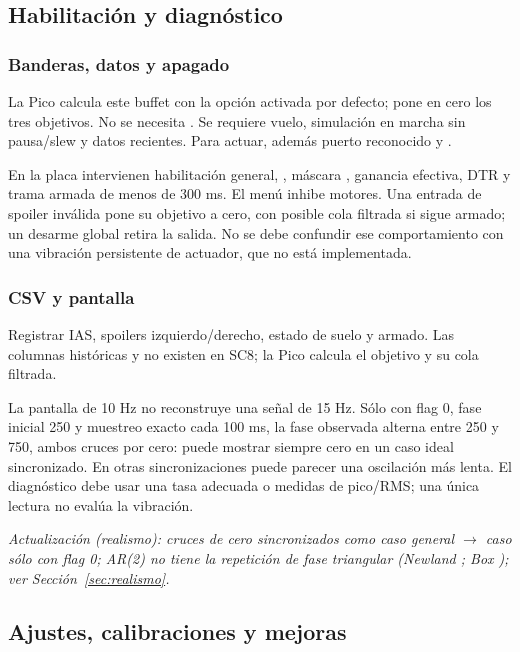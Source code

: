 \subsection{Habilitación y diagnóstico}
\subsubsection{Banderas, datos y apagado}
La Pico calcula este buffet con la opción activada por defecto;  pone en cero los tres objetivos. No se necesita . Se requiere vuelo, simulación en marcha sin pausa/slew y datos recientes. Para actuar, además puerto reconocido y .

En la placa intervienen habilitación general, , máscara , ganancia efectiva, DTR y trama armada de menos de 300 ms. El menú inhibe motores. Una entrada de spoiler inválida pone su objetivo a cero, con posible cola filtrada si sigue armado; un desarme global retira la salida. No se debe confundir ese comportamiento con una vibración persistente de actuador, que no está implementada.

\subsubsection{CSV y pantalla}
Registrar IAS, spoilers izquierdo/derecho, estado de suelo y armado. Las columnas históricas  y  no existen en SC8; la Pico calcula el objetivo y su cola filtrada.

La pantalla de 10 Hz no reconstruye una señal de 15 Hz. Sólo con flag 0, fase inicial 250 y muestreo exacto cada 100 ms, la fase observada alterna entre 250 y 750, ambos cruces por cero: puede mostrar siempre cero en un caso ideal sincronizado. En otras sincronizaciones puede parecer una oscilación más lenta. El diagnóstico debe usar una tasa adecuada o medidas de pico/RMS; una única lectura no evalúa la vibración.

\textit{Actualización (realismo): cruces de cero sincronizados como caso general $\rightarrow$ caso sólo con flag 0; AR(2) no tiene la repetición de fase triangular (Newland \cite{newland1993}; Box \cite{box}); ver Sección~\ref{sec:realismo}.}

\subsection{Ajustes, calibraciones y mejoras}
